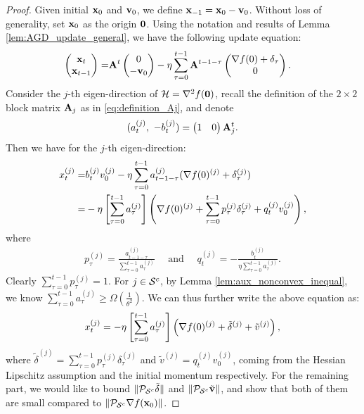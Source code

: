 \begin{proof}
Given initial $\x_0$ and $\v_0$, we define $\x_{-1} = \x_0 - \v_0$.
Without loss of generality, set $\x_{0}$ as the origin $\zero$.  
Using the notation and results of Lemma \ref{lem:AGD_update_general}, 
we have the following update equation:
\begin{align*}
\pmat{\x_{t} \\ \x_{t-1}} =& \A^{t}\pmat{0 \\ -\v_0} 
-\eta\sum_{\tau = 0}^{t-1} \A^{t-1-\tau}\pmat{\grad f(0) + \delta_{\tau} \\ 0}.
\end{align*}
Consider the $j$-th eigen-direction of $\H = \hess f(\zero)$, 
recall the definition of the $2\times 2$ block matrix $\A_j$ as 
in \eqref{eq:definition_Aj}, and denote
\begin{equation*}
(a^{(j)}_{t}, ~-b^{(j)}_t) =\pmat{1 & 0 }\A_j^{t}.
\end{equation*}
Then we have for the $j$-th eigen-direction:
\begin{align*}
x_t^{(j)}
= &b_t^{(j)} v_0^{(j)} 
-\eta\sum_{\tau = 0}^{t-1} a_{t-1-\tau}^{(j)}
(\grad f(0)^{(j)} + \delta_\tau^{(j)})\\
= &-\eta\left[\sum_{\tau = 0}^{t-1} a_\tau^{(j)}\right]
\left(\grad f(0)^{(j)} + \sum_{\tau = 0}^{t-1} p^{(j)}_\tau \delta_\tau^{(j)}
+ q^{(j)}_t  v_0^{(j)} \right),
\end{align*}
where 
\begin{align*}
p^{(j)}_\tau 
= \frac{a_{t-1-\tau}^{(j)}}{\sum_{\tau = 0}^{t-1} a_\tau^{(j)}}
\quad \text{~and~} \quad
q^{(j)}_t = - \frac{b_t^{(j)}}{\eta\sum_{\tau = 0}^{t-1} a_\tau^{(j)}}.
\end{align*}
Clearly $\sum_{\tau=0}^{t-1} p^{(j)}_\tau  = 1$. For $j \in \S^c$, by Lemma \ref{lem:aux_nonconvex_inequal}, we know
$\sum_{\tau = 0}^{t-1} a_\tau^{(j)} \ge \Omega(\frac{1}{\theta^2})$. 
We can thus further write the above equation as:
\begin{equation*}
x_t^{(j)} = -\eta\left[\sum_{\tau = 0}^{t-1} a_\tau^{(j)}\right]
\left(\grad f(0)^{(j)} + \tilde{\delta}^{(j)} + \tilde{v}^{(j)} \right),
\end{equation*}
where $\tilde{\delta}^{(j)} = \sum_{\tau = 0}^{t-1} p^{(j)}_\tau \delta_\tau^{(j)}$
and $\tilde{v}^{(j)} = q^{(j)}_t  v_0^{(j)}$, coming from the Hessian Lipschitz 
assumption and the initial momentum respectively.
For the remaining part, we would like to bound $\|\proj_{\S^c} \tilde{\delta}\|$ and $\norm{\proj_{\S^c} \tilde{\v}}$, and show that both of them are small compared to $\norm{\proj_{\S^c}\grad f(\x_{0})}$.


\end{proof}
